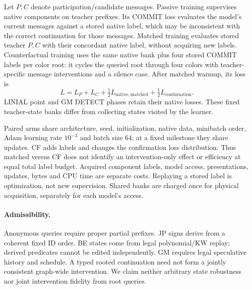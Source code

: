 \documentclass[10pt]{article}
\begin{document}
Let $P,C$ denote participation/candidate messages. Passive training
supervises native components on teacher prefixes. Its COMMIT loss evaluates
the model's current messages against a stored native label, which may be
inconsistent with the correct continuation for those messages. Matched
training evaluates stored teacher $P,C$ with their concordant native label,
without acquiring new labels. Counterfactual training uses the same native
bank plus four stored COMMIT labels per color root: it cycles the queried
root through four colors with teacher-specific message interventions and a
silence case. After matched warmup, its loss is
\[
L=L_P+L_C+\tfrac12L_{\mathrm{native,matched}}+
\tfrac12L_{\mathrm{continuation}}.
\]
LINIAL point and GM DETECT phases retain their native losses. These fixed
teacher-state banks differ from collecting states visited by the learner.

Paired arms share architecture, seed, initialization, native data, minibatch
order, Adam \citep{kingma2015adam} learning rate $10^{-3}$ and batch size 64; at a fixed milestone
they share updates. CF adds labels and changes the confirmation loss
distribution. Thus matched versus CF does not identify an intervention-only
effect or efficiency at equal total label budget. Acquired component labels,
model access, presentations, updates, bytes and CPU time are separate costs.
Replaying a stored label is optimization, not new supervision. Shared banks
are charged once for physical acquisition, separately for each model's access.

\paragraph{Admissibility.}
Anonymous queries require proper partial prefixes. JP signs derive from a
coherent fixed ID order. BE states come from legal polynomial/KW replay;
derived predicates cannot be edited independently. GM requires legal
speculative history and schedule. A typed rooted continuation need not form
a jointly consistent graph-wide intervention. We claim neither arbitrary
state robustness nor joint intervention fidelity from root queries.
\end{document}

